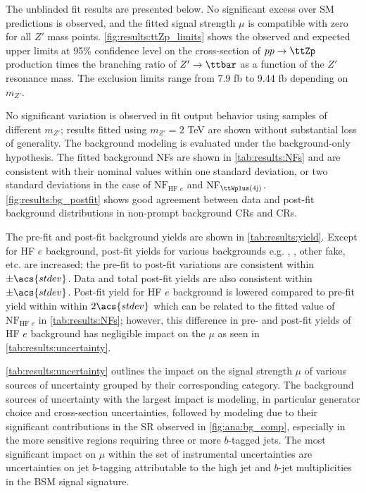 \documentclass[../thesis.tex]{subfiles}
\begin{document}
The unblinded fit results are presented below. No significant excess over \acs{SM} predictions is observed, and the fitted signal strength $\mu$ is compatible with zero for all $Z'$ mass points. \autoref{fig:results:ttZp_limits} shows the observed and expected upper limits at 95\% confidence level on the cross-section of $pp\rightarrow\ttZp$ production times the branching ratio of $Z'\rightarrow\ttbar$ as a function of the $Z'$ resonance mass. The exclusion limits range from 7.9 fb to 9.44 fb depending on $m_{Z'}$.

No significant variation is observed in fit output behavior using \ttZp samples of different $m_{Z'}$; results fitted using $m_{Z'}=2$ TeV are shown without substantial loss of generality. The background modeling is evaluated under the background-only hypothesis. The fitted background \acs{NF}s are shown in \autoref{tab:results:NFs} and are consistent with their nominal values within one standard deviation, or two standard deviations in the case of $\mathrm{NF}_{\text{HF }e}$ and $\mathrm{NF}_{\ttWplus(4\mathrm{j})}$. \autoref{fig:results:bg_postfit} shows good agreement between data and post-fit background distributions in non-prompt background \acs{CR}s and \ttW \acs{CR}s.


The pre-fit and post-fit background yields are shown in \autoref{tab:results:yield}. Except for HF $e$ background, post-fit yields for various backgrounds e.g. \tttt, \ttH, other fake, etc. are increased; the pre-fit to post-fit variations are consistent within $\pm \acs{stdev}$. Data and total post-fit yields are also consistent within $\pm \acs{stdev}$. Post-fit yield for HF $e$ background is lowered compared to pre-fit yield within within $2\acs{stdev}$ which can be related to the fitted value of $\text{NF}_{\text{HF }e}$ in \autoref{tab:results:NFs}; however, this difference in pre- and post-fit yields of HF $e$ background has negligible impact on the $\mu$ as seen in \autoref{tab:results:uncertainty}.

\autoref{tab:results:uncertainty} outlines the impact on the signal strength $\mu$ of various sources of uncertainty grouped by their corresponding category. The background sources of uncertainty with the largest impact is \tttt modeling, in particular \tttt generator choice and cross-section uncertainties, followed by \ttW modeling due to their significant contributions in the \acs{SR} observed in \autoref{fig:ana:bg_comp}, especially in the more sensitive regions requiring three or more $b$-tagged jets. The most significant impact on $\mu$ within the set of instrumental uncertainties are uncertainties on jet $b$-tagging attributable to the high jet and $b$-jet multiplicities in the \acs{BSM} \tttt signal signature.
\end{document}
